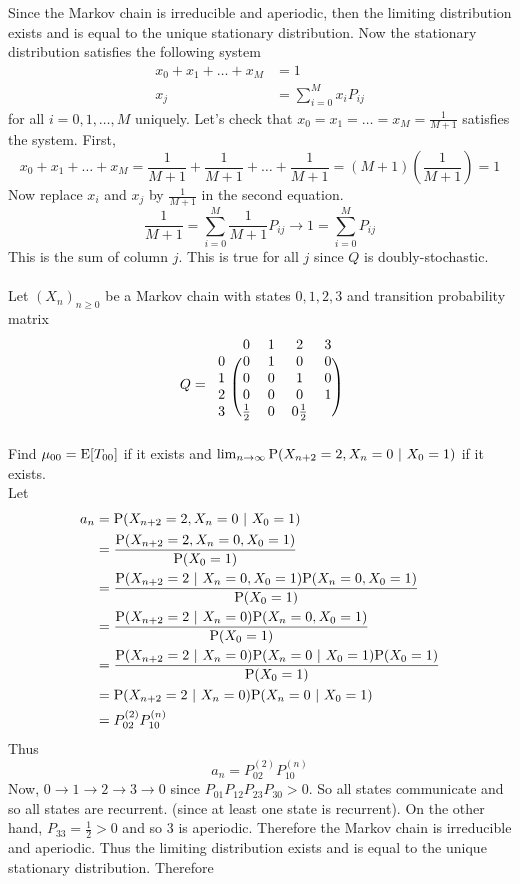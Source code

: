 \documentclass[12pt]{article}
\begin{document}
Since the Markov chain is irreducible and aperiodic, then the limiting distribution exists and is equal to the unique stationary distribution. Now the stationary distribution satisfies the following system $$ \begin{aligned} x_0 + x_1 + \dots + x_M &= 1 \\ x_j &= \sum_{i=0}^M x_iP_{ij} \end{aligned} $$ for all $i = 0,1,\dots,M$ uniquely. Let's check that $x_0 = x_1 = \dots =x_M = \frac{1}{M+1}$ satisfies the system. First, $$ x_0 + x_1 + \dots + x_M = \frac{1}{M+1} + \frac{1}{M+1} + \dots + \frac{1}{M+1} = (M+1)(\frac{1}{M+1}) = 1$$ Now replace $x_i$ and $x_j$ by $\frac{1}{M+1}$ in the second equation. $$ \frac{1}{M+1} = \sum_{i=0}^M \frac{1}{M+1}P_{ij} \to 1 = \sum_{i=0}^M P_{ij} $$ This is the sum of column $j$. This is true for all $j$ since $Q$ is doubly-stochastic. \\~\\
Let $(X_n)_{n\geq0}$ be a Markov chain with states $0,1,2,3$ and transition probability matrix $$Q = \begin{blockarray}{ccccc}
&0&1&2&3 \\
\begin{block}{c(cccc)}
0 & 0 & 1 & 0 & 0 \\
1 & 0 & 0 & 1 & 0 \\  
2 & 0 & 0 & 0 & 1 \\ 
3 & \frac{1}{2} & 0 & 0 \frac{1}{2} \\ \end{block} \end{blockarray} $$
Find $\mu_{00} = \mathrm{E}[ T_{00} ]$ if it exists and $\lim_{n\to\infty} \mathrm{P}( X_{n+2} = 2, X_n = 0 ~|~ X_0=1 )$ if it exists. \\ 
Let $$ \begin{aligned} a_n &= \mathrm{P}( X_{n+2} = 2, X_n = 0 ~|~ X_0 = 1 ) \\ &= \frac{\mathrm{P}( X_{n+2} = 2, X_n = 0, X_0=1 )}{\mathrm{P}( X_0 = 1 )} \\ &= \frac{\mathrm{P}( X_{n+2} = 2 ~|~ X_n = 0, X_0 = 1 )\mathrm{P}( X_n=0,X_0=1 )}{\mathrm{P}( X_0=1 )} \\ &= \frac{\mathrm{P}( X_{n+2} = 2 ~|~ X_n=0 )\mathrm{P}( X_n=0,X_0=1 )}{\mathrm{P}( X_0=1 )} \\ &= \frac{\mathrm{P}( X_{n+2} = 2 ~|~ X_n = 0 )\mathrm{P}( X_n=0 ~|~ X_0=1 )\mathrm{P}( X_0=1 )}{\mathrm{P}( X_0=1 )} \\  &= \mathrm{P}( X_{n+2} = 2 ~|~ X_n = 0 ) \mathrm{P}( X_n=0 ~|~ X_0=1 ) \\ &= P_{02}^{(2)}P_{10}^{(n)} \end{aligned} $$ Thus $$ a_n = P_{02}^{(2)}P_{10}^{(n)} $$ Now, $0\to1\to2\to3\to0$ since $P_{01}P_{12}P_{23}P_{30} > 0$. So all states communicate and so all states are recurrent. (since at least one state is recurrent). On the other hand, $P_{33} = \frac{1}{2} > 0$ and so $3$ is aperiodic. Therefore the Markov chain is irreducible and aperiodic. Thus the limiting distribution exists and is equal to the unique stationary distribution. Therefore 
\end{document}
